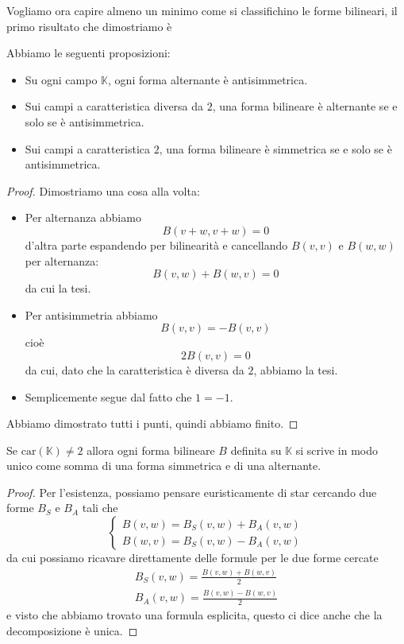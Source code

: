 \documentclass[11pt]{scrartcl}
\newcommand{\KK}{\mathbb{K}}
\begin{document}
	Vogliamo ora capire almeno un minimo come si classifichino le forme bilineari,
	il primo risultato che dimostriamo è
	\begin{proposition}
		Abbiamo le seguenti proposizioni:
		\begin{itemize}
			\item Su ogni campo $\KK$, ogni forma alternante è antisimmetrica.
			\item Sui campi a caratteristica diversa da $2$, una forma bilineare è alternante se e solo se è antisimmetrica.
			\item Sui campi a caratteristica $2$, una forma bilineare è simmetrica se e solo se è antisimmetrica.
		\end{itemize}
	\end{proposition}
	\begin{proof}
		Dimostriamo una cosa alla volta:
		\begin{itemize}
			\item Per alternanza abbiamo
			$$B(v+w,v+w)=0$$
			d'altra parte espandendo per bilinearità e cancellando $B(v,v)$ e $B(w,w)$ per alternanza:
			$$B(v,w)+B(w,v)=0$$
			da cui la tesi.
			\item Per antisimmetria abbiamo
			$$B(v,v)=-B(v,v)$$
			cioè
			$$2B(v,v)=0$$
			da cui, dato che la caratteristica è diversa da $2$, abbiamo la tesi.
			\item Semplicemente segue dal fatto che $1=-1$.
		\end{itemize}
		Abbiamo dimostrato tutti i punti, quindi abbiamo finito.
	\end{proof}
	
	\begin{theorem}[di decomposizione]
		Se $\text{car}(\KK)\ne 2$ allora ogni forma bilineare $B$ definita su $\KK$ si scrive in modo unico come somma di una forma simmetrica e di una alternante.
	\end{theorem}
	\begin{proof}
		Per l'esistenza, possiamo pensare euristicamente di star cercando due forme $B_S$ e $B_A$ tali che
		$$
		\begin{cases}
			B(v,w)=B_S(v,w)+B_A(v,w) \\
			B(w,v)=B_S(v,w)-B_A(v,w)
		\end{cases}
		$$
		da cui possiamo ricavare direttamente delle formule per le due forme cercate
		\begin{gather*}
			B_S(v,w)=\frac{B(v,w)+B(w,v)}{2} \\
			B_A(v,w)=\frac{B(v,w)-B(w,v)}{2}
		\end{gather*}
		e visto che abbiamo trovato una formula esplicita, questo ci dice anche che la decomposizione è unica.
	\end{proof}
	
\end{document}

